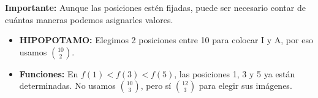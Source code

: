 \begin{nota}
    \textbf{Importante:} Aunque las posiciones estén fijadas, puede ser necesario contar de cuántas maneras podemos asignarles valores.
\end{nota}

\begin{ejemplo}

\begin{itemize}
    \item \textbf{HIPOPOTAMO:} Elegimos 2 posiciones entre 10 para colocar I y A, por eso usamos $\binom{10}{2}$.

    \item \textbf{Funciones:} En $f(1)<f(3)<f(5)$, las posiciones 1, 3 y 5 ya están determinadas. No usamos $\binom{10}{3}$, pero sí $\binom{12}{3}$ para elegir sus imágenes.
\end{itemize}


\end{ejemplo}


